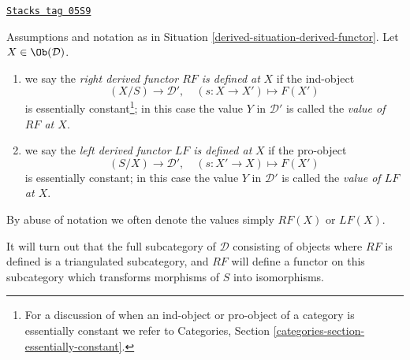 \begin{definition}
\label{derived-definition-right-derived-functor-defined}
\href{https://stacks.math.columbia.edu/tag/05S9}{\texttt{Stacks tag 05S9}}

Assumptions and notation as in
Situation \ref{derived-situation-derived-functor}.
Let $X \in \Ob(\mathcal{D})$.
\begin{enumerate}
\item we say the {\it right derived functor $RF$ is defined at}
$X$ if the ind-object
$$
(X/S) \longrightarrow \mathcal{D}', \quad
(s : X \to X') \longmapsto F(X')
$$
is essentially constant\footnote{For a discussion of when an ind-object
or pro-object of a category is essentially constant we refer to
Categories, Section \ref{categories-section-essentially-constant}.};
in this case the value
$Y$ in $\mathcal{D}'$ is called the {\it value of $RF$ at $X$}.
\item we say the {\it left derived functor $LF$ is defined at} $X$
if the pro-object
$$
(S/X) \longrightarrow \mathcal{D}', \quad
(s: X' \to X) \longmapsto F(X')
$$
is essentially constant; in this case the value $Y$ in $\mathcal{D}'$
is called the {\it value of $LF$ at $X$}.
\end{enumerate}
By abuse of notation we often denote the values simply
$RF(X)$ or $LF(X)$.
\end{definition}

It will turn out that the full subcategory of $\mathcal{D}$ consisting
of objects where $RF$ is defined is a triangulated subcategory, and
$RF$ will define a functor on this subcategory which transforms morphisms
of $S$ into isomorphisms.

